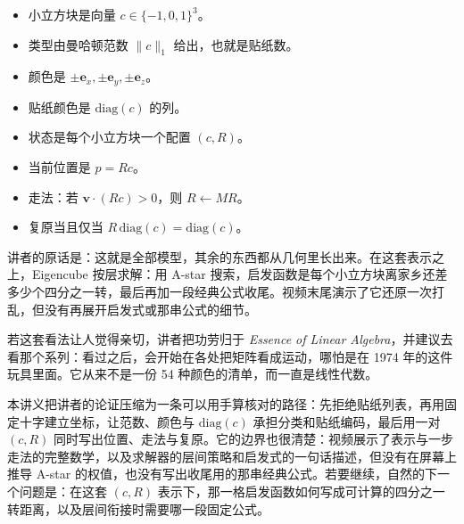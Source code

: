 \documentclass[a4paper]{article}
\begin{document}
\begin{itemize}
\item 小立方块是向量 $c\in\{-1,0,1\}^3$。
\item 类型由曼哈顿范数 $\|c\|_1$ 给出，也就是贴纸数。
\item 颜色是 $\pm\mathbf{e}_x,\pm\mathbf{e}_y,\pm\mathbf{e}_z$。
\item 贴纸颜色是 $\mathrm{diag}(c)$ 的列。
\item 状态是每个小立方块一个配置 $(c,R)$。
\item 当前位置是 $p=Rc$。
\item 走法：若 $\mathbf{v}\cdot(Rc)>0$，则 $R\leftarrow MR$。
\item 复原当且仅当 $R\,\mathrm{diag}(c)=\mathrm{diag}(c)$。
\end{itemize}

讲者的原话是：这就是全部模型，其余的东西都从几何里长出来。在这套表示之上，Eigencube 按层求解：用 A-star 搜索，启发函数是每个小立方块离家乡还差多少个四分之一转，最后再加一段经典公式收尾。视频末尾演示了它还原一次打乱，但没有再展开启发式或那串公式的细节。

若这套看法让人觉得亲切，讲者把功劳归于 \emph{Essence of Linear Algebra}，并建议去看那个系列：看过之后，会开始在各处把矩阵看成运动，哪怕是在 1974 年的这件玩具里面。它从来不是一份 54 种颜色的清单，而一直是线性代数。

本讲义把讲者的论证压缩为一条可以用手算核对的路径：先拒绝贴纸列表，再用固定十字建立坐标，让范数、颜色与 $\mathrm{diag}(c)$ 承担分类和贴纸编码，最后用一对 $(c,R)$ 同时写出位置、走法与复原。它的边界也很清楚：视频展示了表示与一步走法的完整数学，以及求解器的层间策略和启发式的一句话描述，但没有在屏幕上推导 A-star 的权值，也没有写出收尾用的那串经典公式。若要继续，自然的下一个问题是：在这套 $(c,R)$ 表示下，那一格启发函数如何写成可计算的四分之一转距离，以及层间衔接时需要哪一段固定公式。

\end{document}
